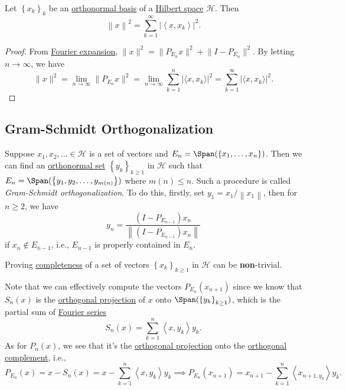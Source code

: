 \begin{corollary}\label{col:Parseval}
	Let \(\left\{ x_k \right\} _k\) be an \hyperref[def:orthonormal-basis]{orthonormal basis} of a \hyperref[def:Hilbert-space]{Hilbert space} \(\mathcal{H} \). Then
	\[
		\left\lVert x\right\rVert ^{2} = \sum_{k=1}^{\infty} \left\vert \left\langle x, x_k \right\rangle  \right\vert ^{2} .
	\]
\end{corollary}
\begin{proof}
	From \hyperref[thm:Fourier-expansion]{Fourier expansion}, \(\lVert x \rVert ^{2} = \lVert P_{E_n} x \rVert^{2} + \lVert I - P_{E_n} \rVert ^{2}\). By letting \(n \to \infty \), we have
	\[
		\lVert x \rVert^{2}
		= \lim_{n \to \infty} \lVert P_{E_n}x \rVert ^{2}
		= \lim_{n \to \infty} \sum_{k=1}^{n} \vert \langle x, x_{k} \rangle \vert ^{2}
		= \sum_{k=1}^{\infty} \vert \langle x, x_{k} \rangle \vert ^{2}.
	\]
\end{proof}

\subsection{Gram-Schmidt Orthogonalization}
Suppose \(x_1, x_2, \dots \in \mathcal{H}\) is a set of vectors and \(E_n = \Span(\left\{ x_1, \dots , x_n \right\} )\). Then we can find an \hyperref[def:orthonormal-system]{orthonormal set} \(\left\{ y_{k} \right\}_{k\geq 1}\) in \(\mathcal{H}\) such that \(E_n = \Span(\left\{ y_1, y_2, \dots , y_{m(n)}  \right\} )\) where \(m(n) \leq n\). Such a procedure is called \emph{Gram-Schmidt orthogonalization}. To do this, firstly, set \(y_1 = x_1 / \left\lVert x_1\right\rVert \), then for \(n \geq 2\), we have
\[
	y_n = \frac{(I - P_{E_{n-1}})x_n}{\left\lVert (I - P_{E_{n-1}})x_n \right\rVert}
\]
if \(x_n \notin E_{n-1}\), i.e., \(E_{n-1}\) is properly contained in \(E_n\).

\begin{remark}
	Proving \hyperref[def:complete-system]{completeness} of a set of vectors \(\left\{ x_k \right\}_{k\geq 1} \) in \(\mathcal{H} \) can be \textbf{non}-trivial.
\end{remark}

Note that we can effectively compute the vectors \(P_{E_n} (x_{n+1}) \) since we know that \(S_n(x)\) is the \hyperref[def:orthogonal-projection]{orthogonal projection} of \(x\) onto \(\Span(\left\{ y_k \right\}_{k\geq 1} )\), which is the partial sum of \hyperref[def:Fourier-series]{Fourier series}
\[
	S_n(x) = \sum_{k=1} ^n \left\langle x, y_k \right\rangle y_k.
\]
As for \(P_n(x)\), we see that it's the \hyperref[def:orthogonal-projection]{orthogonal projection} onto the \hyperref[def:orthogonal-complement]{orthogonal complement}, i.e.,
\[
	P_{E_n}(x) = x - S_n(x) = x - \sum_{k=1} ^n \left\langle x, y_{k}  \right\rangle y_{k} \implies P_{E_n}(x_{n+1} ) = x_{n+1} - \sum\limits_{k=1}^{n} \left\langle x_{n+1, y_{k} }  \right\rangle  y_{k}.
\]

